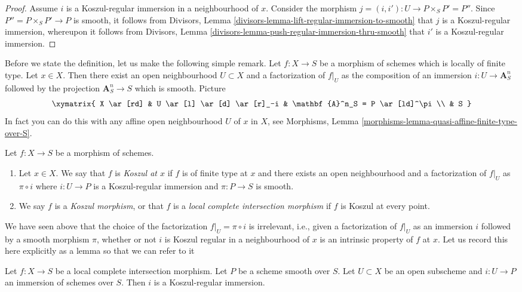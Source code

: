 \begin{proof}
Assume $i$ is a Koszul-regular immersion in a neighbourhood of $x$.
Consider the morphism $j = (i, i') : U \to P \times_S P' = P''$.
Since $P'' = P \times_S P' \to P$ is smooth, it follows from
Divisors, Lemma \ref{divisors-lemma-lift-regular-immersion-to-smooth}
that $j$ is a Koszul-regular immersion, whereupon it follows from
Divisors, Lemma \ref{divisors-lemma-push-regular-immersion-thru-smooth}
that $i'$ is a Koszul-regular immersion.
\end{proof}

\noindent
Before we state the definition, let us make the following simple
remark. Let $f : X \to S$ be a morphism of schemes which is locally
of finite type. Let $x \in X$. Then there exist an open neighbourhood
$U \subset X$ and a factorization of $f|_U$ as the composition of an
immersion $i : U \to \mathbf{A}^n_S$ followed by the projection
$\mathbf{A}^n_S \to S$ which is smooth. Picture
$$
\xymatrix{
X \ar[rd] & U \ar[l] \ar[d] \ar[r]_-i & \mathbf{A}^n_S = P \ar[ld]^\pi \\
& S
}
$$
In fact you can do this with any affine open neighbourhood
$U$ of $x$ in $X$, see
Morphisms, Lemma \ref{morphisms-lemma-quasi-affine-finite-type-over-S}.

\begin{definition}
\label{definition-lci}
Let $f : X \to S$ be a morphism of schemes.
\begin{enumerate}
\item Let $x \in X$. We say that $f$ is {\it Koszul at $x$} if $f$
is of finite type at $x$ and there exists an open neighbourhood
and a factorization of $f|_U$ as $\pi \circ i$ where $i : U \to P$
is a Koszul-regular immersion and $\pi : P \to S$ is smooth.
\item We say $f$ is a {\it Koszul morphism}, or that
$f$ is a {\it local complete intersection morphism}
if $f$ is Koszul at every point.
\end{enumerate}
\end{definition}

\noindent
We have seen above that the choice of the factorization
$f|_U = \pi \circ i$ is irrelevant, i.e., given a factorization
of $f|_U$ as an immersion $i$ followed by a smooth morphism $\pi$, whether or
not $i$ is Koszul regular in a neighbourhood of $x$ is an intrinsic
property of $f$ at $x$. Let us record this here explicitly as a lemma
so that we can refer to it

\begin{lemma}
\label{lemma-lci}
Let $f : X \to S$ be a local complete intersection morphism.
Let $P$ be a scheme smooth over $S$. Let $U \subset X$ be an open subscheme
and $i : U \to P$ an immersion of schemes over $S$.
Then $i$ is a Koszul-regular immersion.
\end{lemma}

